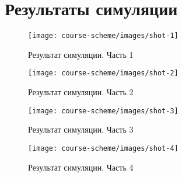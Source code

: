 \fontsize{14}{16pt}\selectfont
\chapter{Результаты симуляции}
\label{cha:appendix2}
\begin{figure}[h!]
	\centering
	\texttt{[image: course-scheme/images/shot-1]}
	\caption{Результат симуляции. Часть 1}
	\label{fig:shot-1}
\end{figure}
\begin{figure}[h!]
	\centering
	\texttt{[image: course-scheme/images/shot-2]}
	\caption{Результат симуляции. Часть 2}
	\label{fig:shot-2}
\end{figure}
\begin{figure}[h!]
	\centering
	\texttt{[image: course-scheme/images/shot-3]}
	\caption{Результат симуляции. Часть 3}
	\label{fig:shot-3}
\end{figure}
\begin{figure}[h!]
	\centering
	\texttt{[image: course-scheme/images/shot-4]}
	\caption{Результат симуляции. Часть 4}
	\label{fig:shot-4}
\end{figure}



